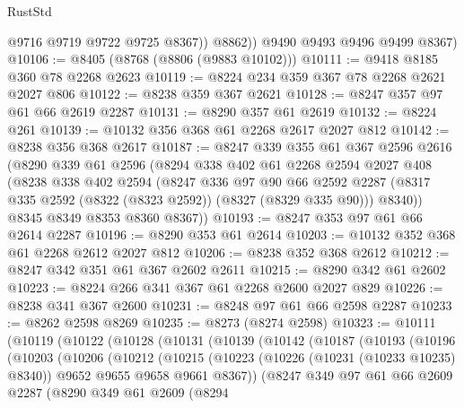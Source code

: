 \begin{lexlean}{RustStd}
\begin{coremodule}
{\begin{coremodule}
{{{{{{{{{{{{{{{{{{{{{{{{{{{{{{{{{{{{{{{{{{{{{{{{{{{{{{              @9716
              @9719
              @9722
              @9725
              @8367))
          @8862))
      @9490
      @9493
      @9496
      @9499
      @8367)
@10106 := @8405 (@8768 (@8806 (@9883 @10102)))
@10111 := @9418 @8185 @360 @78 @2268 @2623
@10119 := @8224 @234 @359 @367 @78 @2268 @2621 @2027 @806
@10122 := @8238 @359 @367 @2621
@10128 := @8247 @357 @97 @61 @66 @2619 @2287
@10131 := @8290 @357 @61 @2619
@10132 := @8224 @261
@10139 := @10132 @356 @368 @61 @2268 @2617 @2027 @812
@10142 := @8238 @356 @368 @2617
@10187 := @8247
    @339
    @355
    @61
    @367
    @2596
    @2616
    (@8290
      @339
      @61
      @2596
      (@8294
        @338
        @402
        @61
        @2268
        @2594
        @2027
        @408
        (@8238
          @338
          @402
          @2594
          (@8247
            @336
            @97
            @90
            @66
            @2592
            @2287
            (@8317 @335 @2592 (@8322 (@8323 @2592)) (@8327 (@8329 @335 @90)))
            @8340))
        @8345
        @8349
        @8353
        @8360
        @8367))
@10193 := @8247 @353 @97 @61 @66 @2614 @2287
@10196 := @8290 @353 @61 @2614
@10203 := @10132 @352 @368 @61 @2268 @2612 @2027 @812
@10206 := @8238 @352 @368 @2612
@10212 := @8247 @342 @351 @61 @367 @2602 @2611
@10215 := @8290 @342 @61 @2602
@10223 := @8224 @266 @341 @367 @61 @2268 @2600 @2027 @829
@10226 := @8238 @341 @367 @2600
@10231 := @8248 @97 @61 @66 @2598 @2287
@10233 := @8262 @2598 @8269
@10235 := @8273 (@8274 @2598)
@10323 := @10111
    (@10119
      (@10122
        (@10128
          (@10131
            (@10139
              (@10142
                (@10187
                  (@10193
                    (@10196
                      (@10203
                        (@10206
                          (@10212
                            (@10215
                              (@10223
                                (@10226 (@10231 (@10233 @10235) @8340))
                                @9652
                                @9655
                                @9658
                                @9661
                                @8367))
                            (@8247
                              @349
                              @97
                              @61
                              @66
                              @2609
                              @2287
                              (@8290
                                @349
                                @61
                                @2609
                                (@8294
}}}}}}}}}}}}}}}}}}}}}}}}}}}}}}}}}}}}}}}}}}}}}}}}}}}}}}
\end{coremodule}}
\end{coremodule}
\end{lexlean}
